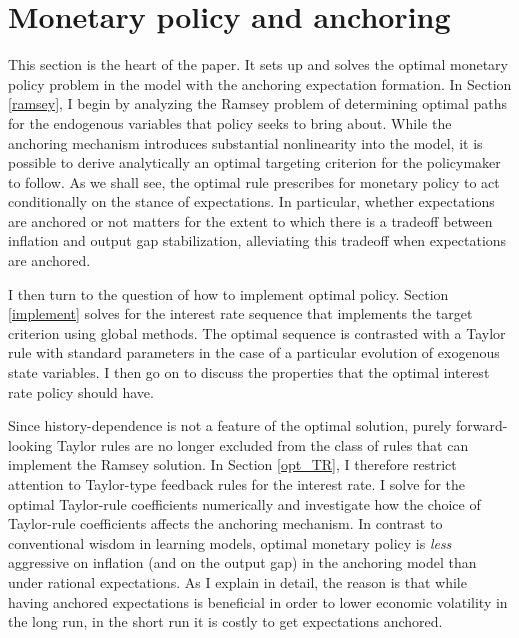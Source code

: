 \documentclass[11pt]{article}
\renewcommand{\[}{\begin{equation}}
\renewcommand{\]}{\end{equation}}
\begin{document}
\section{Monetary policy and anchoring}\label{analytical}

This section is the heart of the paper. It sets up and solves the optimal monetary policy problem in the model with the anchoring expectation formation. In Section \ref{ramsey}, I begin by analyzing the Ramsey problem of determining optimal paths for the endogenous variables that policy seeks to bring about.  While the anchoring mechanism introduces substantial nonlinearity into the model, it is possible to derive analytically an optimal targeting criterion for the policymaker to follow. As we shall see, the optimal rule prescribes for monetary policy to act conditionally on the stance of expectations. In particular, whether expectations are anchored or not matters for the extent to which there is a tradeoff between inflation and output gap stabilization, alleviating this tradeoff when expectations are anchored. 

I then turn to the question of how to implement optimal policy. Section \ref{implement} solves for the interest rate sequence that implements the target criterion using global methods. The optimal sequence is contrasted with a Taylor rule with standard parameters in the case of a particular evolution of exogenous state variables. I then go on to discuss the properties that the optimal interest rate policy should have. 

Since history-dependence is not a feature of the optimal solution, purely forward-looking Taylor rules are no longer excluded from the class of rules that can implement the Ramsey solution. In Section \ref{opt_TR}, I therefore restrict attention to Taylor-type feedback rules for the interest rate. I solve for the optimal Taylor-rule coefficients numerically and investigate how the choice of Taylor-rule coefficients affects the anchoring mechanism. In contrast to conventional wisdom in learning models, optimal monetary policy is \emph{less} aggressive on inflation (and on the output gap) in the anchoring model than under rational expectations. As I explain in detail, the reason is that while having anchored expectations is beneficial in order to lower economic volatility in the long run, in the short run it is costly to get expectations anchored.

\end{document}
